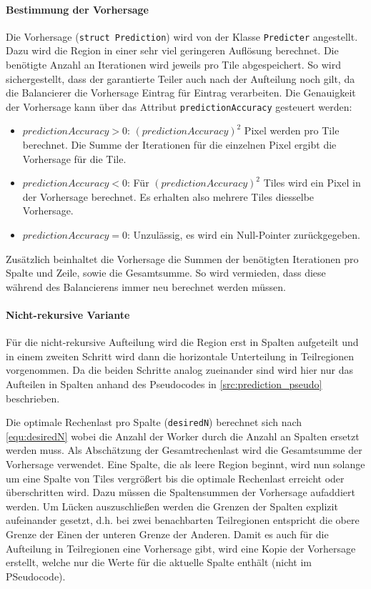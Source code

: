 \paragraph*{Bestimmung der Vorhersage}\label{par:predicter}
Die Vorhersage (\verb|struct Prediction|) wird von der Klasse \verb|Predicter| angestellt.
Dazu wird die Region in einer sehr viel geringeren Auflösung berechnet.
Die benötigte Anzahl an Iterationen wird jeweils pro Tile abgespeichert.
So wird sichergestellt, dass der garantierte Teiler auch nach der Aufteilung noch gilt, da die Balancierer die Vorhersage Eintrag für Eintrag verarbeiten.
Die Genauigkeit der Vorhersage kann über das Attribut \verb|predictionAccuracy| gesteuert werden:
\begin{itemize}
	\item $predictionAccuracy > 0$: $(predictionAccuracy)^2$ Pixel werden pro Tile berechnet. Die Summe der Iterationen für die einzelnen Pixel ergibt die Vorhersage für die Tile.
	\item $predictionAccuracy < 0$: Für $(predictionAccuracy)^2$ Tiles wird ein Pixel in der Vorhersage berechnet. Es erhalten also mehrere Tiles diesselbe Vorhersage.
	\item $predictionAccuracy = 0$: Unzulässig, es wird ein Null-Pointer zurückgegeben.
\end{itemize}
Zusätzlich beinhaltet die Vorhersage die Summen der benötigten Iterationen pro Spalte und Zeile, sowie die Gesamtsumme.
So wird vermieden, dass diese während des Balancierens immer neu berechnet werden müssen.

\paragraph*{Nicht-rekursive Variante}\label{lastbalancierung_vorhersage}
Für die nicht-rekursive Aufteilung wird die Region erst in Spalten aufgeteilt und in einem zweiten Schritt wird dann die horizontale Unterteilung in Teilregionen vorgenommen.
Da die beiden Schritte analog zueinander sind wird hier nur das Aufteilen in Spalten anhand des Pseudocodes in \autoref{src:prediction_pseudo} beschrieben.

Die optimale Rechenlast pro Spalte (\verb|desiredN|) berechnet sich nach \autoref{equ:desiredN} wobei die Anzahl der Worker durch die Anzahl an Spalten ersetzt werden muss.
Als Abschätzung der Gesamtrechenlast wird die Gesamtsumme der Vorhersage verwendet.
Eine Spalte, die als leere Region beginnt, wird nun solange um eine Spalte von Tiles vergrößert bis die optimale Rechenlast erreicht oder überschritten wird.
Dazu müssen die Spaltensummen der Vorhersage aufaddiert werden.
Um Lücken auszuschließen werden die Grenzen der Spalten explizit aufeinander gesetzt, d.h. bei zwei benachbarten Teilregionen entspricht die obere Grenze der Einen der unteren Grenze der Anderen.
Damit es auch für die Aufteilung in Teilregionen eine Vorhersage gibt, wird eine Kopie der Vorhersage erstellt, welche nur die Werte für die aktuelle Spalte enthält (nicht im PSeudocode).

